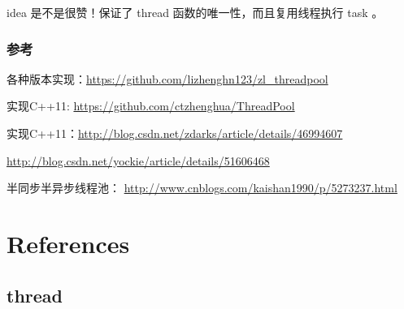 \documentclass[UTF8,a4paper,12pt]{ctexbook}
\begin{document}
			idea 是不是很赞！保证了 thread 函数的唯一性，而且复用线程执行 task 。
			
			
		\subsubsection{参考}
			各种版本实现：\url{https://github.com/lizhenghn123/zl_threadpool}
			
			实现C++11: \url{https://github.com/ctzhenghua/ThreadPool}
			
			实现C++11：\url{http://blog.csdn.net/zdarks/article/details/46994607}
			
			\url{http://blog.csdn.net/yockie/article/details/51606468}
			
			半同步半异步线程池： \url{http://www.cnblogs.com/kaishan1990/p/5273237.html}
\section{References}
	\subsection{thread}
\end{document}
